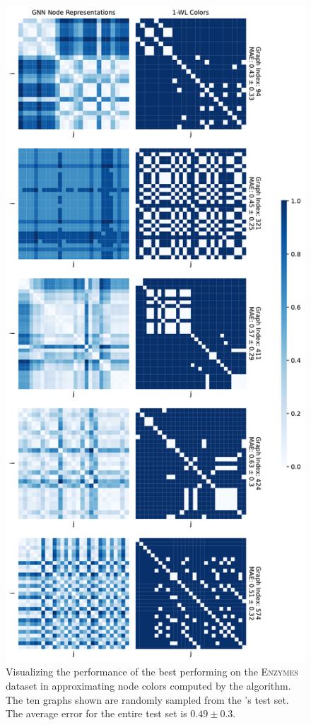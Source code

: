 \begin{figure}[H]
\begin{minipage}[b]{0.45992852703\textwidth}
    \end{minipage}
    \hfill
    \begin{minipage}[b]{0.53007147296\textwidth}
        \includegraphics[width=\textwidth, right]{Figures/heatmaps_ENZYMES_1.pdf}
    \end{minipage}
    \hfill
    \caption{Visualizing the performance of the best performing \gnn on the \textsc{Enzymes} dataset in approximating node colors computed by the \wl algorithm. The ten graphs shown are randomly sampled from the \gnn's test set. The average error for the entire test set is $0.49 \pm 0.3$.}
    \label{fig:gnn_approx_enzymes}
\end{figure}
\clearpage

